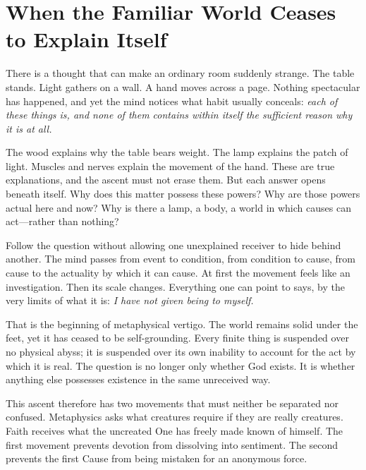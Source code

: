 \section{When the Familiar World Ceases to Explain Itself}

There is a thought that can make an ordinary room suddenly strange. The table stands. Light gathers on a wall. A hand moves across a page. Nothing spectacular has happened, and yet the mind notices what habit usually conceals: \emph{each of these things is, and none of them contains within itself the sufficient reason why it is at all.}

The wood explains why the table bears weight. The lamp explains the patch of light. Muscles and nerves explain the movement of the hand. These are true explanations, and the ascent must not erase them. But each answer opens beneath itself. Why does this matter possess these powers? Why are those powers actual here and now? Why is there a lamp, a body, a world in which causes can act---rather than nothing?

Follow the question without allowing one unexplained receiver to hide behind another. The mind passes from event to condition, from condition to cause, from cause to the actuality by which it can cause. At first the movement feels like an investigation. Then its scale changes. Everything one can point to says, by the very limits of what it is: \emph{I have not given being to myself.}

That is the beginning of metaphysical vertigo. The world remains solid under the feet, yet it has ceased to be self-grounding. Every finite thing is suspended over no physical abyss; it is suspended over its own inability to account for the act by which it is real. The question is no longer only whether God exists. It is whether anything else possesses existence in the same unreceived way.


This ascent therefore has two movements that must neither be separated nor confused. Metaphysics asks what creatures require if they are really creatures. Faith receives what the uncreated One has freely made known of himself. The first movement prevents devotion from dissolving into sentiment. The second prevents the first Cause from being mistaken for an anonymous force.

